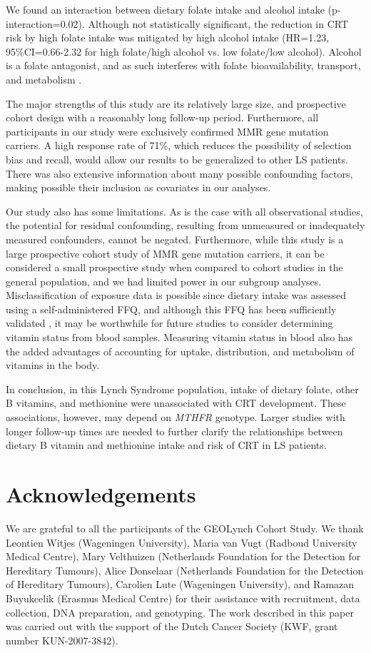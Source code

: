 \noindent We found an interaction between dietary folate intake and alcohol intake (p-interaction=0.02). Although not statistically significant, the reduction in CRT risk by high folate intake was mitigated by high alcohol intake (HR=1.23, 95\%CI=0.66-2.32 for high folate/high alcohol vs. low folate/low alcohol). Alcohol is a folate antagonist, and as such interferes with folate bioavailability, transport, and metabolism \cite{c650}.

\noindent The major strengths of this study are its relatively large size, and prospective cohort design with a reasonably long follow-up period. Furthermore, all participants in our study were exclusively confirmed MMR gene mutation carriers. A high response rate of 71\%, which reduces the possibility of selection bias and recall, would allow our results to be generalized to other LS patients. There was also extensive information about many possible confounding factors, making possible their inclusion as covariates in our analyses.

\noindent Our study also has some limitations. As is the case with all observational studies, the potential for residual confounding, resulting from unmeasured or inadequately measured confounders, cannot be negated. Furthermore, while this study is a large prospective cohort study of MMR gene mutation carriers, it can be considered a small prospective study when compared to cohort studies in the general population, and we had limited power in our subgroup analyses. Misclassification of exposure data is possible since dietary intake was assessed using a self-administered FFQ, and although this FFQ has been sufficiently validated \cite{c628,c629}, it may be worthwhile for future studies to consider determining vitamin status from blood samples. Measuring vitamin status in blood also has the added advantages of accounting for uptake, distribution, and metabolism of vitamins in the body.

\noindent In conclusion, in this Lynch Syndrome population, intake of dietary folate, other B vitamins, and methionine were unassociated with CRT development. These associations, however, may depend on \emph{MTHFR} genotype. Larger studies with longer follow-up times are needed to further clarify the relationships between dietary B vitamin and methionine intake and risk of CRT in LS patients. 

\section*{Acknowledgements} 
We are grateful to all the participants of the GEOLynch Cohort Study. We thank Leontien Witjes (Wageningen University), Maria van Vugt (Radboud University Medical Centre), Mary Velthuizen (Netherlands Foundation for the Detection for Hereditary Tumours), Alice Donselaar (Netherlands Foundation for the Detection of Hereditary Tumours), Carolien Lute (Wageningen University), and Ramazan Buyukcelik (Erasmus Medical Centre) for their assistance with recruitment, data collection, DNA preparation, and genotyping. The work described in this paper was carried out with the support of the Dutch Cancer Society (KWF, grant number KUN-2007-3842). 
 

